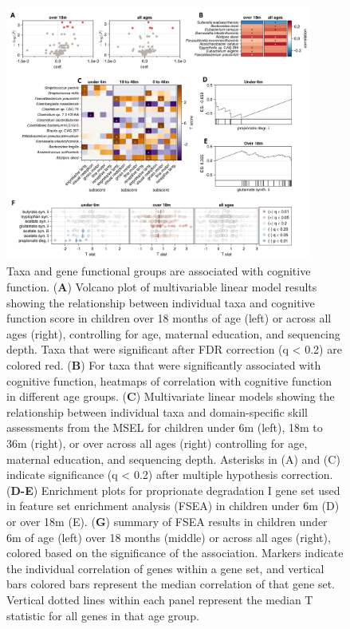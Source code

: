 \documentclass{article}
\begin{document}
\begin{figure}
    \centering
    \small
    \includegraphics[width=0.9\textwidth]{assets/Figure2.png}
    \caption{
        Taxa and gene functional groups are associated with cognitive function.
        (\textbf{A}) Volcano plot of multivariable linear model results showing the
        relationship between individual taxa and cognitive function score in
        children over 18 months of age (left) or across all ages (right),
        controlling for age, maternal education, and sequencing depth.
        Taxa that were significant after FDR correction (q
        \textless{} 0.2) are colored red. (\textbf{B}) For taxa that were significantly
        associated with cognitive function,
        heatmaps of correlation with cognitive function in different age groups.
        (\textbf{C}) Multivariate linear models showing the relationship
        between individual taxa and domain-specific skill assessments
        from the MSEL for children under 6m (left), 18m to 36m (right),
        or over across all ages (right)
        controlling for age, maternal education, and sequencing depth.
        Asterisks in (A) and (C) indicate significance (q \textless{} 0.2)
        after multiple hypothesis correction.
        (\textbf{D-E}) Enrichment plots for proprionate degradation I gene set
        used in feature set enrichment analysis (FSEA) in children under 6m (D)
        or over 18m (E). (\textbf{G}) summary of FSEA
        results in children under 6m of age (left)
        over 18 months (middle) or across all ages (right), colored based on the
        significance of the association. Markers indicate the individual
        correlation of genes within a gene set,
        and vertical bars colored bars represent the
        median correlation of that gene set.
        Vertical dotted lines within each panel represent the median T statistic
        for all genes in that age group.
    }
    \label{fig:2}
\end{figure}
\end{document}
